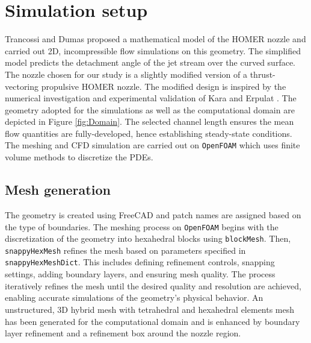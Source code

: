 \section{Simulation setup} \label{setup}
Trancossi and Dumas \cite{trandum} proposed a mathematical model of the HOMER nozzle and carried out 2D, incompressible flow simulations on this geometry. The simplified model predicts the detachment angle of the jet stream over the curved surface. The nozzle chosen for our study is a slightly modified version of a thrust-vectoring propulsive HOMER nozzle. The modified design is inspired by the numerical investigation and experimental validation of Kara and Erpulat \cite{kara}. The geometry adopted for the simulations as well as the computational domain are depicted in Figure \ref{fig:Domain}. The selected channel length ensures the mean flow quantities are fully-developed, hence establishing steady-state conditions. The meshing and CFD simulation are carried out on \verb|OpenFOAM| which uses finite volume methods to discretize the PDEs. 
\subsection{Mesh generation}
The geometry is created using FreeCAD \cite{FreeCAD} and patch names are assigned based on the type of boundaries.  The meshing process on \verb|OpenFOAM| begins with the discretization of the geometry into hexahedral blocks using \verb|blockMesh|. Then, \verb|snappyHexMesh| refines the mesh based on parameters specified in \verb|snappyHexMeshDict|. This includes defining refinement controls, snapping settings, adding boundary layers, and ensuring mesh quality. The process iteratively refines the mesh until the desired quality and resolution are achieved, enabling accurate simulations of the geometry's physical behavior. An unstructured, 3D hybrid mesh with tetrahedral and hexahedral elements mesh has been generated for the computational domain and is enhanced by boundary layer refinement and a refinement box around the nozzle region.
